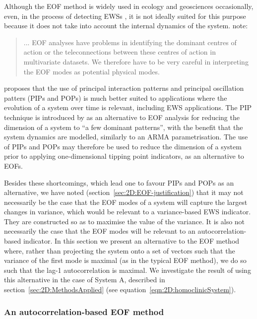 Although the EOF method is widely used in ecology and geosciences \citep{hasselmann1988,dommenget2001,bathiany2013p1} occasionally, even, in the process of detecting EWSs \citep{held2004}, it is not ideally suited for this purpose because it does not take into account the internal dynamics of the system. \cite{dommenget2001} note:
	\begin{quote}
		... EOF analyses have problems in identifying the dominant centres of action or the teleconnections between these centres of action in multivariate datasets. We therefore have to be very careful in interpreting the EOF modes as potential physical modes. 
	\end{quote}
\cite{hasselmann1988} proposes that the use of principal interaction patterns and principal oscillation patters (PIPs and POPs) \citep{von1995,kwasniok1996} is much better suited to applications where the evolution of a system over time is relevant, including EWS applications. The PIP technique is introduced by \cite{hasselmann1988} as an alternative to EOF analysis for reducing the dimension of a system to ``a few dominant patterns'', with the benefit that the system dynamics are modelled, similarly to an ARMA parametrisation. The use of PIPs and POPs may therefore be used to reduce the dimension of a system prior to applying one-dimensional tipping point indicators, as an alternative to EOFs. 

Besides these shortcomings, which lead one to favour PIPs and POPs as an alternative, we have noted (section~\ref{sec:2D:EOF-justification}) that it may not necessarily be the case that the EOF modes of a system will capture the largest changes in variance, which would be relevant to a variance-based EWS indicator. They are constructed so as to maximise the value of the variance. It is also not necessarily the case that the EOF modes will be relevant to an autocorrelation-based indicator. In this section we present an alternative to the EOF method where, rather than projecting the system onto a set of vectors such that the variance of the first mode is maximal (as in the typical EOF method), we do so such that the lag-1 autocorrelation is maximal. We investigate the result of using this alternative in the case of System A, described in section~\ref{sec:2D:MethodsApplied} (see equation~\ref{eqn:2D:homoclinicSystem}).
 

\subsubsection{An autocorrelation-based EOF method}

